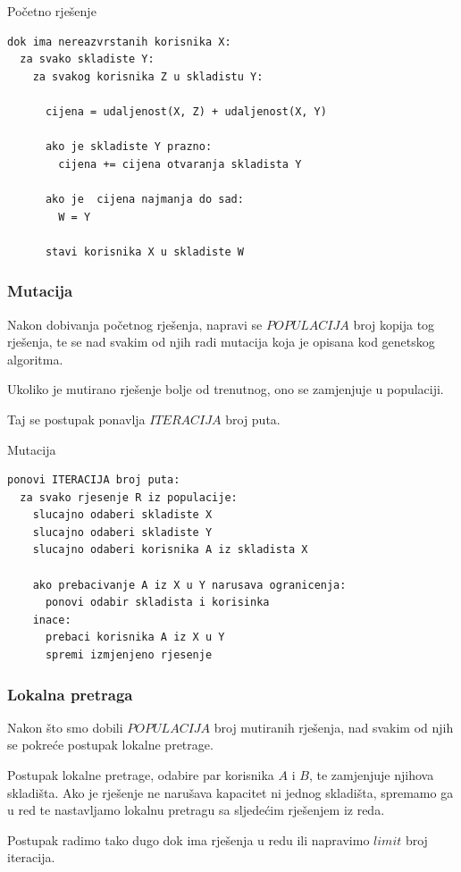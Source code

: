 \documentclass[utf8]{beamer}
\begin{document}
\begin{frame}[fragile]{Početno rješenje}
\begin{lstlisting}
dok ima nereazvrstanih korisnika X:
  za svako skladiste Y:
    za svakog korisnika Z u skladistu Y:  
    
      cijena = udaljenost(X, Z) + udaljenost(X, Y)
      
      ako je skladiste Y prazno:
        cijena += cijena otvaranja skladista Y
    
      ako je  cijena najmanja do sad:
        W = Y
  
      stavi korisnika X u skladiste W
\end{lstlisting}
\end{frame}

\begin{frame}
\frametitle{Mutacija}

Nakon dobivanja početnog rješenja, napravi se $POPULACIJA$ broj kopija tog rješenja, te se nad svakim od njih radi mutacija koja je opisana kod genetskog algoritma.

\vspace{5mm}

Ukoliko je mutirano rješenje bolje od trenutnog, ono se zamjenjuje u populaciji.

\vspace{5mm}

Taj se postupak ponavlja $ITERACIJA$ broj puta.

\end{frame}

\begin{frame}[fragile]{Mutacija}
\begin{lstlisting}
ponovi ITERACIJA broj puta:
  za svako rjesenje R iz populacije:
    slucajno odaberi skladiste X
    slucajno odaberi skladiste Y
    slucajno odaberi korisnika A iz skladista X
    
    ako prebacivanje A iz X u Y narusava ogranicenja:
      ponovi odabir skladista i korisinka
    inace:
      prebaci korisnika A iz X u Y
      spremi izmjenjeno rjesenje
\end{lstlisting}
\end{frame}

\begin{frame}
\frametitle{Lokalna pretraga}

Nakon što smo dobili $POPULACIJA$ broj mutiranih rješenja, nad svakim od njih se pokreće postupak lokalne pretrage. 

\vspace{5mm}

Postupak lokalne pretrage, odabire par korisnika $A$ i $B$, te zamjenjuje njihova skladišta. Ako je rješenje ne narušava kapacitet ni jednog skladišta, spremamo ga u red te nastavljamo lokalnu pretragu sa sljedećim rješenjem iz reda.

\vspace{5mm}

Postupak radimo tako dugo dok ima rješenja u redu ili napravimo $limit$ broj iteracija.

\end{frame}
\end{document}
